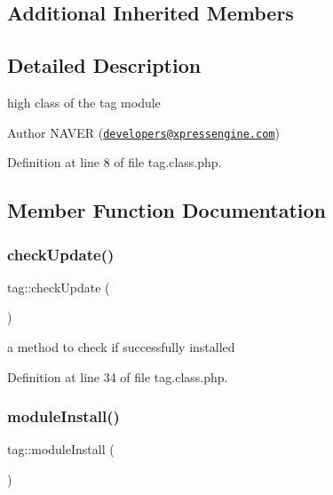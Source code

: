 \subsection*{Additional Inherited Members}


\subsection{Detailed Description}
high class of the tag module 

\begin{DoxyAuthor}{Author}
N\+A\+V\+ER (\href{mailto:developers@xpressengine.com}{\tt developers@xpressengine.\+com}) 
\end{DoxyAuthor}


Definition at line 8 of file tag.\+class.\+php.



\subsection{Member Function Documentation}
\mbox{\label{classtag_ab8fa1f64862dc89a3a7455ba983a2a34}} 
\subsubsection{\texorpdfstring{check\+Update()}{checkUpdate()}}
{\footnotesize\ttfamily tag\+::check\+Update (\begin{DoxyParamCaption}{ }\end{DoxyParamCaption})}



a method to check if successfully installed 



Definition at line 34 of file tag.\+class.\+php.

\mbox{\label{classtag_aa1d24f3693778a2b40dad2f24e8dbafe}} 
\subsubsection{\texorpdfstring{module\+Install()}{moduleInstall()}}
{\footnotesize\ttfamily tag\+::module\+Install (\begin{DoxyParamCaption}{ }\end{DoxyParamCaption})}



